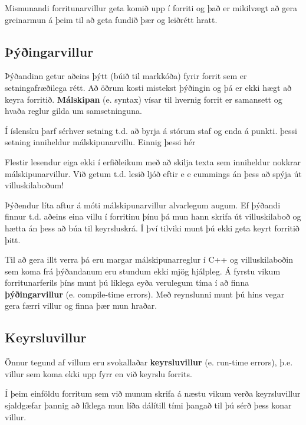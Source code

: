 Mismunandi forritunarvillur geta komið upp í forriti og það er mikilvægt að gera greinarmun á þeim til að geta fundið þær og leiðrétt hratt.

\subsection{Þýðingarvillur}

Þýðandinn getur aðeins þýtt (búið til markkóða) fyrir forrit sem er setningafræðilega rétt.
Að öðrum kosti mistekst þýðingin og þá er ekki hægt að keyra forritið.
{\bf Málskipan} (e. syntax) vísar til hvernig forrit er samansett og hvaða reglur gilda um samsetninguna.


Í íslensku þarf sérhver setning t.d. að byrja á stórum staf og enda á punkti.
þessi setning inniheldur málskipunarvillu. Einnig þessi hér 

Flestir lesendur eiga ekki í erfiðleikum með að skilja texta sem inniheldur nokkrar málskipunarvillur.
Við getum t.d. lesið ljóð eftir e e cummings án þess að spýja út villuskilaboðum!

Þýðendur líta aftur á móti málskipunarvillur alvarlegum augum.
Ef þýðandi finnur t.d. aðeins eina villu í forritinu þínu þá mun hann skrifa út villuskilaboð og hætta án þess að búa til keyrsluskrá.
Í því tilviki munt þú ekki geta keyrt forritið þitt.

Til að gera illt verra þá eru margar málskipunarreglur í C++ og villuskilaboðin sem koma frá þýðandanum eru stundum ekki mjög hjálpleg.
Á fyrstu vikum forritunarferils þíns munt þú líklega eyða verulegum tíma í að finna {\bf þýðingarvillur} (e. compile-time errors).
Með reynslunni munt þú hins vegar gera færri villur og finna þær mun hraðar.

\subsection{Keyrsluvillur}
\label{run-time}

Önnur tegund af villum eru svokallaðar {\bf keyrsluvillur} (e. run-time errors), þ.e. villur sem koma ekki upp fyrr en við keyrslu forrits.

Í þeim einföldu forritum sem við munum skrifa á næstu vikum verða keyrsluvillur sjaldgæfar þannig að líklega mun líða dálítill tími þangað til þú sérð þess konar villur.


